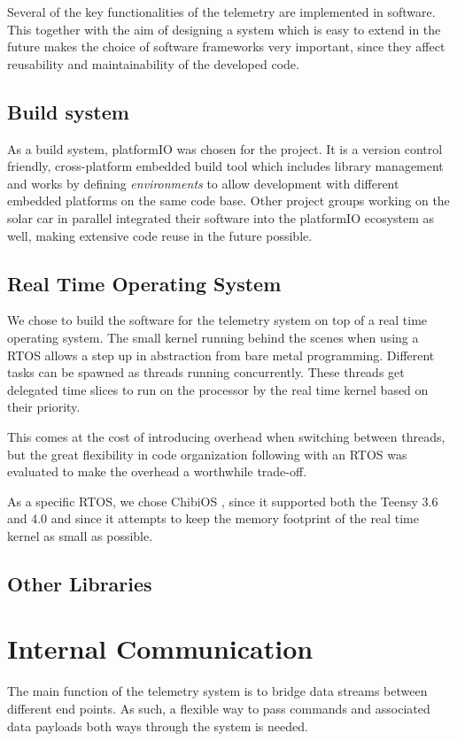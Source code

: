\documentclass[conference]{IEEEtran}
\begin{document}
Several of the key functionalities of the telemetry are implemented in software. This together with the aim of designing a system which is easy to extend in the future makes the choice of software frameworks very important, since they affect reusability and maintainability of the developed code.

\subsection{Build system}
As a build system, platformIO \cite{platformIO} was chosen for the project. It is a version control friendly, cross-platform embedded build tool which includes library management and works by defining \textit{environments} to allow development with different embedded platforms on the same code base. Other project groups working on the solar car in parallel integrated their software into the platformIO ecosystem as well, making extensive code reuse in the future possible.

\subsection{Real Time Operating System}
We chose to build the software for the telemetry system on top of a real time operating system. The small kernel running behind the scenes when using a RTOS allows a step up in abstraction from bare metal programming. Different tasks can be spawned as threads running concurrently. These threads get delegated time slices to run on the processor by the real time kernel based on their priority. 

This comes at the cost of introducing overhead when switching between threads, but the great flexibility in code organization following with an RTOS was evaluated to make the overhead a worthwhile trade-off.

As a specific RTOS, we chose ChibiOS \cite{chibios}, since it supported both the Teensy 3.6 and 4.0 and since it attempts to keep the memory footprint of the real time kernel as small as possible.

\subsection{Other Libraries}
% 

\section{Internal Communication}
The main function of the telemetry system is to bridge data streams between different end points. As such, a flexible way to pass commands and associated data payloads both ways through the system is needed. 
\end{document}
